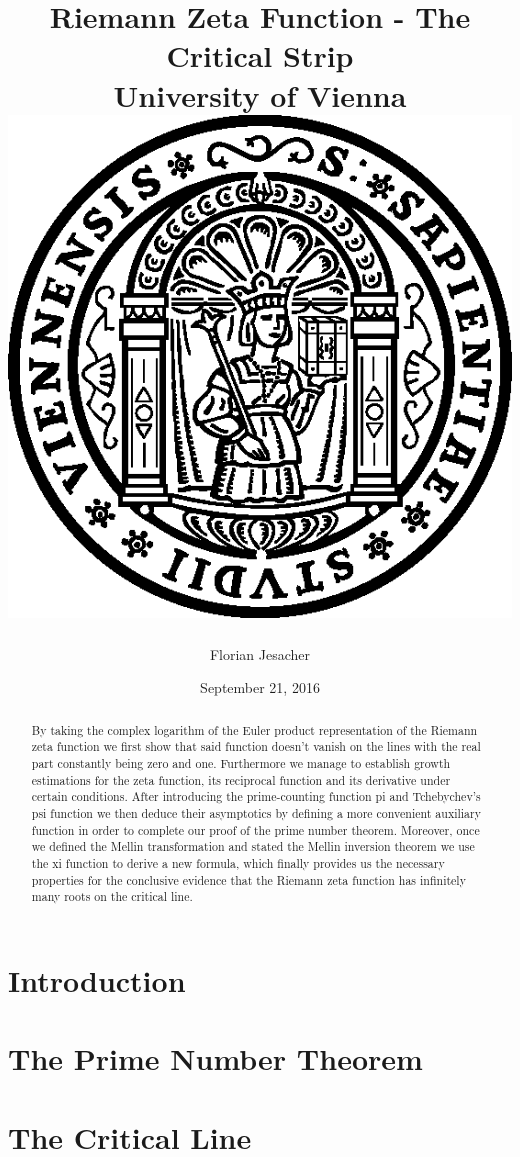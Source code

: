 \documentclass[11pt]{report}
\begin{document}
\title{
	{Riemann Zeta Function - The Critical Strip}\\
	{\large University of Vienna}\\
	{\vspace{3ex}\includegraphics[width=15ex]{University.png}}
}
\author{Florian Jesacher}
\date{September 21, 2016}
\maketitle

\begin{abstract}
By taking the complex logarithm of the Euler product representation of the Riemann zeta function we first show that said function doesn't vanish on the lines with the real part constantly being zero and one. Furthermore we manage to establish growth estimations for the zeta function, its reciprocal function and its derivative under certain conditions. After introducing the prime-counting function pi and Tchebychev's psi function we then deduce their asymptotics by defining a more convenient auxiliary function in order to complete our proof of the prime number theorem. Moreover, once we defined the Mellin transformation and stated the Mellin inversion theorem we use the xi function to derive a new formula, which finally provides us the necessary properties for the conclusive evidence that the Riemann zeta function has infinitely many roots on the critical line.
\end{abstract}

\tableofcontents

\chapter{Introduction}


\chapter{The Prime Number Theorem}


\chapter{The Critical Line}


\appendix


\nocite{*}
\end{document}
